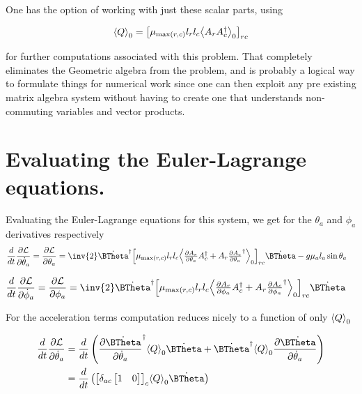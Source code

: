 One has the option of working with just these scalar parts, using 

\begin{align}\label{eqn:multiPendulumSpherical2:boo21}
{\left\langle{{Q}}\right\rangle}_{0} = 
{\begin{bmatrix}
\mu_{\max(r,c)} l_r l_c {\left\langle{{ A_r A_c^\dagger }}\right\rangle}_{0}
\end{bmatrix}}_{rc}
\end{align}

for further computations associated with this problem.  That completely eliminates the Geometric algebra from the problem, and is probably a logical way to formulate things for numerical work since one can then exploit any pre existing matrix algebra system without having to create one that understands non-commuting variables and vector products.

\section{Evaluating the Euler-Lagrange equations.}

Evaluating the Euler-Lagrange equations for this system, we get for the $\theta_a$ and $\phi_a$ derivatives respectively
\begin{align}\label{eqn:multiPendulumSpherical2:boo6}
\frac{d}{dt} \PD{\dot{\theta}_a}{\LL}
&=
\PD{\theta_a}{\LL}
=
\inv{2} \dot{\BTheta}^\dagger
{\begin{bmatrix}
\mu_{\max(r,c)} l_r l_c \gpgradezero{
\PD{\theta_a}{A_r} A_c^\dagger
+A_r \PD{\theta_a}{A_c}^\dagger
}
\end{bmatrix}}_{rc} 
\dot{\BTheta}
-g \mu_a l_a \sin\theta_a 
\end{align}

\begin{align}\label{eqn:multiPendulumSpherical2:boo6c}
\frac{d}{dt} \PD{\dot{\phi}_a}{\LL}
&=
\PD{\phi_a}{\LL}
=
\inv{2} \dot{\BTheta}^\dagger
{\begin{bmatrix}
\mu_{\max(r,c)} l_r l_c \gpgradezero{
\PD{\phi_a}{A_r} A_c^\dagger
+A_r \PD{\phi_a}{A_c}^\dagger
}
\end{bmatrix}}_{rc} 
\dot{\BTheta}
\end{align}

For the acceleration terms computation reduces nicely to a function of only ${\left\langle{{Q}}\right\rangle}_{0}$

\begin{align*}
\frac{d}{dt} \PD{\dot{\theta}_a}{\LL}
&=
\frac{d}{dt} 
\left(
\PD{\dot{\theta}_a}{\dot{\BTheta}}^\dagger
\gpgradezero{Q} 
\dot{\BTheta}
+
\dot{\BTheta}^\dagger
\gpgradezero{Q} 
\PD{\dot{\theta}_a}{\dot{\BTheta}}
\right)  \\
&=
\frac{d}{dt} \left(
{\begin{bmatrix}
\delta_{ac}
\begin{bmatrix}
1 & 0
\end{bmatrix}
\end{bmatrix}}_c
\gpgradezero{Q} 
\dot{\BTheta}
\right) 
\end{align*}

